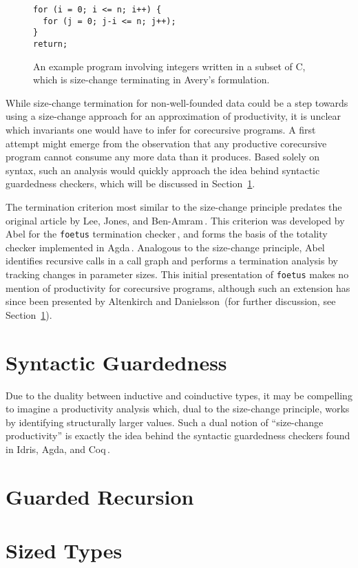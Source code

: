 \begin{figure}
\begin{lstlisting}
for (i = 0; i <= n; i++) {
  for (j = 0; j-i <= n; j++);
}
return;
\end{lstlisting}
\caption{An example program involving integers written in a subset of C, which is size-change terminating in Avery's formulation.}
\label{fig:avery_example}
\end{figure}

While size-change termination for non-well-founded data could be a step towards using a size-change approach for an approximation of productivity, it is unclear which invariants one would have to infer for corecursive programs. A first attempt might emerge from the observation that any productive corecursive program cannot consume any more data than it produces. Based solely on syntax, such an analysis would quickly approach the idea behind syntactic guardedness checkers, which will be discussed in Section~\ref{sec:synt-guard}.

The termination criterion most similar to the size-change principle predates the original article by Lee, Jones, and Ben-Amram\,\citep{LeeJones01SizeChange}. This criterion was developed by Abel for the \texttt{foetus} termination checker\,\citep{Abel98foetus}, and forms the basis of the totality checker implemented in Agda\,\citep{Norell:thesis}. Analogous to the size-change principle, Abel identifies recursive calls in a call graph and performs a termination analysis by tracking changes in parameter sizes. This initial presentation of \texttt{foetus} makes no mention of productivity for corecursive programs, although such an extension has since been presented by Altenkirch and Danielsson\,\citep{AltenkirchNAD10} (for further discussion, see Section~\ref{sec:synt-guard}).

\section{Syntactic Guardedness}
\label{sec:synt-guard}

Due to the duality between inductive and coinductive types, it may be compelling to imagine a productivity analysis which, dual to the size-change principle, works by identifying structurally larger values. Such a dual notion of ``size-change productivity'' is exactly the idea behind the syntactic guardedness checkers found in Idris, Agda, and Coq\,\citep{Coq:manual}. 

\section{Guarded Recursion}

\section{Sized Types}


